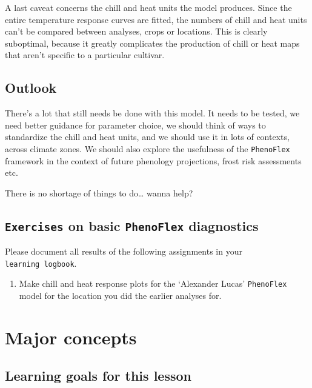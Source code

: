 \documentclass[
]{book}
\providecommand{\tightlist}{%
  \setlength{\itemsep}{0pt}\setlength{\parskip}{0pt}}
\begin{document}
A last caveat concerns the chill and heat units the model produces. Since the entire temperature response curves are fitted, the numbers of chill and heat units can't be compared between analyses, crops or locations. This is clearly suboptimal, because it greatly complicates the production of chill or heat maps that aren't specific to a particular cultivar.

\hypertarget{outlook}{%
\section{Outlook}\label{outlook}}

There's a lot that still needs be done with this model. It needs to be tested, we need better guidance for parameter choice, we should think of ways to standardize the chill and heat units, and we should use it in lots of contexts, across climate zones. We should also explore the usefulness of the \texttt{PhenoFlex} framework in the context of future phenology projections, frost risk assessments etc.

There is no shortage of things to do\ldots{} wanna help?

\hypertarget{ex_phenoflex2}{%
\section*{\texorpdfstring{\texttt{Exercises} on basic \texttt{PhenoFlex} diagnostics}{Exercises on basic PhenoFlex diagnostics}}\label{ex_phenoflex2}}

Please document all results of the following assignments in your \texttt{learning\ logbook}.

\begin{enumerate}
\def\labelenumi{\arabic{enumi})}
\tightlist
\item
  Make chill and heat response plots for the `Alexander Lucas' \texttt{PhenoFlex} model for the location you did the earlier analyses for.
\end{enumerate}

\hypertarget{major_concepts}{%
\chapter{Major concepts}\label{major_concepts}}

\hypertarget{goals_major_concepts}{%
\section*{Learning goals for this lesson}\label{goals_major_concepts}}
\end{document}
